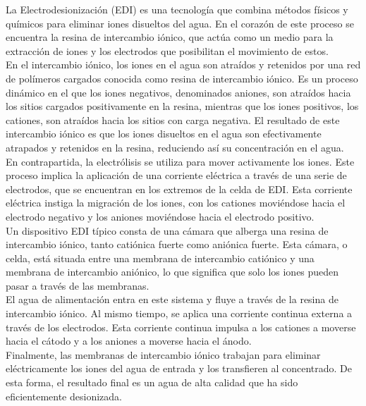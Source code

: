 La Electrodesionización (EDI) es una tecnología que combina métodos físicos y químicos para eliminar iones disueltos
del agua. En el corazón de este proceso se encuentra la resina de intercambio iónico, que actúa como un medio para la
extracción de iones y los electrodos que posibilitan el movimiento de estos. \\

En el intercambio iónico, los iones en el agua son atraídos y retenidos por una red de polímeros cargados conocida como resina de intercambio iónico. Es un proceso dinámico en el que los iones negativos, denominados aniones, son atraídos hacia los sitios cargados positivamente en la resina, mientras que los iones positivos, los cationes, son atraídos hacia los sitios con carga negativa. El resultado de este intercambio iónico es que los iones disueltos en el agua son efectivamente atrapados y retenidos en la resina, reduciendo así su concentración en el agua.\\

En contrapartida, la electrólisis se utiliza para mover activamente los iones. Este proceso implica la aplicación de una corriente eléctrica a través de una serie de electrodos, que se encuentran en los extremos de la celda de EDI. Esta corriente eléctrica instiga la migración de los iones, con los cationes moviéndose hacia el electrodo negativo y los aniones moviéndose hacia el electrodo positivo.\\

Un dispositivo EDI típico consta de una cámara que alberga una resina de intercambio iónico, tanto catiónica fuerte como aniónica fuerte. Esta cámara, o celda, está situada entre una membrana de intercambio catiónico y una membrana de intercambio aniónico, lo que significa que solo los iones pueden pasar a través de las membranas. \\

El agua de alimentación entra en este sistema y fluye a través de la resina de intercambio iónico. Al mismo tiempo, se aplica una corriente continua externa a través de los electrodos. Esta corriente continua impulsa a los cationes a moverse hacia el cátodo y a los aniones a moverse hacia el ánodo.\\

Finalmente, las membranas de intercambio iónico trabajan para eliminar eléctricamente los iones del agua de entrada y los transfieren al concentrado. De esta forma, el resultado final es un agua de alta calidad que ha sido eficientemente desionizada.\\

